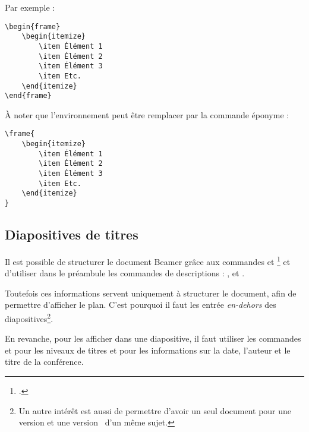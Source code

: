 Par exemple :

\begin{verbatim}
\begin{frame}
	\begin{itemize}
		\item Élément 1
		\item Élément 2
		\item Élément 3
		\item Etc.
	\end{itemize}
\end{frame}
\end{verbatim}

À noter que l'environnement   peut être remplacer par la commande éponyme :

\begin{verbatim}
\frame{
	\begin{itemize}
		\item Élément 1
		\item Élément 2
		\item Élément 3
		\item Etc.
	\end{itemize}
}
\end{verbatim}

\subsection{Diapositives de titres}

Il est possible de structurer le document Beamer grâce aux commandes  et \footcite[Le manuel de  déconseille d'utiliser   parce que \enquote{c'est le diable}.][]{beamer_diable} et d'utiliser dans le préambule les commandes de descriptions : ,  et .

Toutefois ces informations servent uniquement à structurer le document, afin de permettre d'afficher le plan. C'est pourquoi il faut les entrée \emph{en-dehors} des diapositives\footnote{Un  autre intérêt est aussi de permettre d'avoir un seul document pour une version  et une version  d'un même sujet.}.

En revanche, pour les afficher dans une diapositive, il faut utiliser les commandes  et  pour les niveaux de titres et  pour les informations sur la date, l'auteur et le titre de la conférence.

